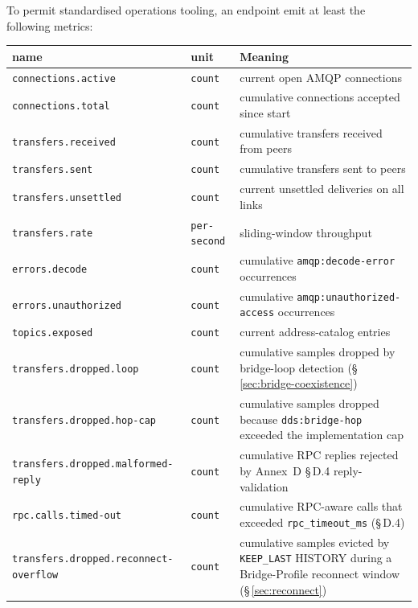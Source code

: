 \documentclass{../styles/zerodds-vendor-spec}
\begin{document}
To permit standardised operations tooling, an endpoint
 emit at least the following metrics:

\begin{longtable}{p{4.6cm}p{2cm}p{5.5cm}}
  \toprule
  \textbf{name} & \textbf{unit} & \textbf{Meaning} \\
  \midrule
  \endhead
  \texttt{connections.active}        & \texttt{count}      & current open AMQP connections \\
  \texttt{connections.total}         & \texttt{count}      & cumulative connections accepted since start \\
  \texttt{transfers.received}        & \texttt{count}      & cumulative transfers received from peers \\
  \texttt{transfers.sent}            & \texttt{count}      & cumulative transfers sent to peers \\
  \texttt{transfers.unsettled}       & \texttt{count}      & current unsettled deliveries on all links \\
  \texttt{transfers.rate}            & \texttt{per-second} & sliding-window throughput \\
  \texttt{errors.decode}             & \texttt{count}      & cumulative \texttt{amqp:decode-error} occurrences \\
  \texttt{errors.unauthorized}       & \texttt{count}      & cumulative \texttt{amqp:unauthorized-access} occurrences \\
  \texttt{topics.exposed}            & \texttt{count}      & current address-catalog entries \\
  \texttt{transfers.dropped.loop}    & \texttt{count}      & cumulative samples dropped by bridge-loop detection (\S\,\ref{sec:bridge-coexistence}) \\
  \texttt{transfers.dropped.hop-cap} & \texttt{count}      & cumulative samples dropped because \texttt{dds:bridge-hop} exceeded the implementation cap \\
  \texttt{transfers.dropped.malformed-reply} & \texttt{count} & cumulative RPC replies rejected by Annex~D \S\,D.4 reply-validation \\
  \texttt{rpc.calls.timed-out}       & \texttt{count}      & cumulative RPC-aware calls that exceeded \texttt{rpc\_timeout\_ms} (\S\,D.4) \\
  \texttt{transfers.dropped.reconnect-overflow} & \texttt{count} & cumulative samples evicted by \texttt{KEEP\_LAST} HISTORY during a Bridge-Profile reconnect window (\S\,\ref{sec:reconnect}) \\
  \bottomrule
\end{longtable}
\end{document}
